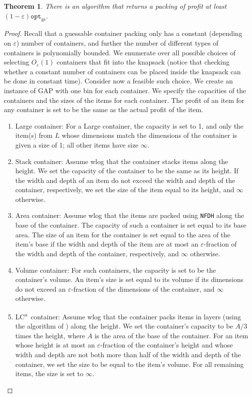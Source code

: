 \documentclass[10pt,a4paper]{amsart}
\renewcommand{\epsilon}{\varepsilon} %
\newcommand{\boxes}{containers\xspace}
\newcommand{\NFDH}{\texttt{NFDH}\xspace}
\newtheorem{theorem}{Theorem}[section]
\theoremstyle{definition}
\newcommand{\optgs}{\mathtt{opt}_{\mathrm{gs}}}
\newcommand{\lca}{LC\textsuperscript{a}}
\begin{document}
\begin{theorem}
\label{thm:GAP}
    There is an algorithm that returns a packing of profit at least $(1-\epsilon)\optgs$.
\end{theorem}
\begin{proof}
    Recall that a guessable container packing only has a constant (depending on $\epsilon$) number of \boxes, and further the number of different types of \boxes is polynomially bounded. We enumerate over all possible choices of selecting $O_{\epsilon}(1)$ \boxes that fit into the knapsack (notice that checking whether a constant number of \boxes can be placed inside the knapsack can be done in constant time). Consider now a feasible such choice. We create an instance of GAP with one bin for each container. We specify the capacities of the \boxes and the sizes of the items for each container. The profit of an item for any container is set to be the same as the actual profit of the item.
    \begin{enumerate}
        \item Large container: For a Large container, the capacity is set to 1, and only the item(s) from $L$ whose dimensions match the dimensions of the container is given a size of 1; all other items have size $\infty$.
        \item Stack container: Assume wlog that the container stacks items along the height. We set the capacity of the container to be the same as its height. If the width and depth of an item do not exceed the width and depth of the container, respectively, we set the size of the item equal to its height, and $\infty$ otherwise.
        \item Area container: Assume wlog that the items are packed using \NFDH along the base of the container. The capacity of such a container is set equal to its base area. The size of an item for the container is set equal to the area of the item's base if the width and depth of the item are at most an $\epsilon$-fraction of the width and depth of the container, respectively, and $\infty$ otherwise.
        \item Volume container: For such \boxes, the capacity is set to be the container's volume. An item's size is set equal to its volume if its dimensions do not exceed an $\epsilon$-fraction of the dimensions of the container, and $\infty$ otherwise.  
        \item \lca\ container: Assume wlog that the container packs items in layers (using the algorithm of \cite{li1990three}) along the height. We set the container's capacity to be $A/3$ times the height, where $A$ is the area of the base of the container. For an item whose height is at most an $\epsilon$-fraction of the container's height and whose width and depth are not both more than half of the width and depth of the container, we set the size to be equal to the item's volume. For all remaining items, the size is set to $\infty$.

\end{enumerate}
\end{proof}
\end{document}
